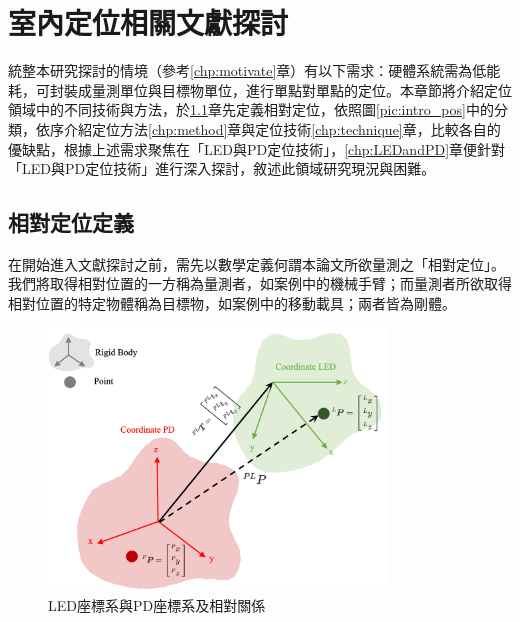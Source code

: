 \chapter{室內定位相關文獻探討}







統整本研究探討的情境（參考\ref{chp:motivate}章）有以下需求：硬體系統需為低能耗，可封裝成量測單位與目標物單位，進行單點對單點的定位。本章節將介紹定位領域中的不同技術與方法，於\ref{chp:relative}章先定義相對定位，依照圖\ref{pic:intro_pos}中的分類，依序介紹定位方法\ref{chp:method}章與定位技術\ref{chp:technique}章，比較各自的優缺點，根據上述需求聚焦在「LED與PD定位技術」，\ref{chp:LEDandPD}章便針對「LED與PD定位技術」進行深入探討，敘述此領域研究現況與困難。









\section{相對定位定義}
\label{chp:relative}
    
    在開始進入文獻探討之前，需先以數學定義何謂本論文所欲量測之「相對定位」。我們將取得相對位置的一方稱為量測者，如案例中的機械手臂；而量測者所欲取得相對位置的特定物體稱為目標物，如案例中的移動載具；兩者皆為剛體。

    \begin{figure}[h]
        \centering
        \includegraphics[width=9cm]{ch2pic/homo_trans.png}
        \caption{LED座標系與PD座標系及相對關係}
        \label{pic:homo_trans}
    \end{figure}
    
